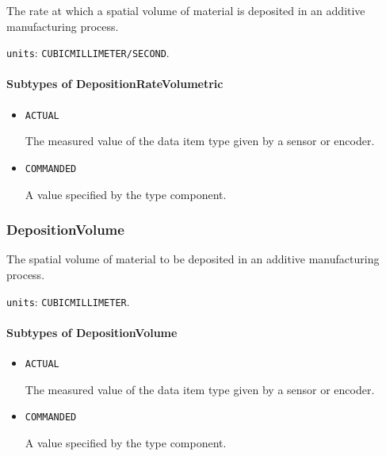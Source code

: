 The rate at which a spatial volume of material is deposited in an additive manufacturing process.


\texttt{units}: \texttt{CUBIC\textunderscore MILLIMETER/SECOND}.

\paragraph{Subtypes of DepositionRateVolumetric}\mbox{}
\label{sec:Subtypes of DepositionRateVolumetric}

\begin{itemize}

\item \texttt{ACTUAL}


The measured value of the data item type given by a sensor or encoder.

\item \texttt{COMMANDED}


A value specified by the  type component.


\end{itemize}





\subsubsection{DepositionVolume}
\label{sec:DepositionVolume}



The spatial volume of material to be deposited in an additive manufacturing process.


\texttt{units}: \texttt{CUBIC\textunderscore MILLIMETER}.

\paragraph{Subtypes of DepositionVolume}\mbox{}
\label{sec:Subtypes of DepositionVolume}

\begin{itemize}

\item \texttt{ACTUAL}


The measured value of the data item type given by a sensor or encoder.

\item \texttt{COMMANDED}


A value specified by the  type component.


\end{itemize}





